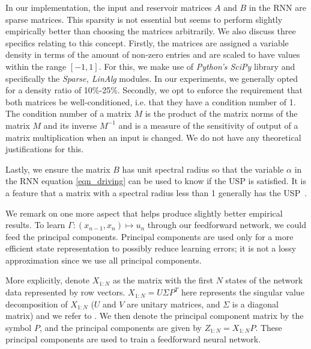 In our implementation, the input and reservoir  matrices $A$ and $B$ in the RNN are sparse matrices. This sparsity is not essential but seems to perform slightly empirically better than choosing the matrices arbitrarily.  We also discuss three specifics relating to this concept. Firstly, the matrices are assigned a variable density in terms of the amount of non-zero entries and are scaled to have values within the range $[-1,1]$. For this, we make use of \textit{Python's SciPy} library and specifically the \textit{Sparse, LinAlg} modules. In our experiments, we generally opted for a density ratio of 10\%-25\%.
Secondly, we opt to enforce the requirement that both matrices be well-conditioned, i.e. that they have a condition number of 1. The condition number of a matrix $M$ is the product of the matrix norms of the matrix $M$ and its inverse $M^{-1}$ and is a measure of the sensitivity of output of a matrix multiplication when an input is changed.  We do not have any theoretical justifications for this. 

Lastly, we ensure the matrix $B$ has unit spectral radius so that the variable $\alpha$ in the RNN equation \eqref{eqn_driving} can be used to know if the USP is satisfied. 
It is a  feature that a matrix with a spectral radius less than 1 generally has the USP~\cite{yildiz2012re}.  

We remark on one more aspect that helps produce slightly better empirical results.  To learn $\Gamma: (x_{n-1},x_{n}) \mapsto u_n$ through our feedforward network, we could feed the principal components. 
Principal components are used only for a more efficient state representation to possibly reduce learning errors; it is not a lossy approximation since we use all principal components.

More explicitly, denote $X_{1:N}$ as the matrix with the first $N$ states of the network data represented by row vectors. 
$X_{1:N}=U\Sigma P^T$ here represents the singular value decomposition of $X_{1:N}$ ($U$ and $V$ are unitary matrices, and $\Sigma$ is a diagonal matrix) and we refer to \cite{wikiSVdecomp}. 
We then denote the principal component matrix by the symbol $P$, and the principal components are given by 
 $Z_{1:N}=X_{1:N}P$.
These principal components are used to train a feedforward neural network. 

